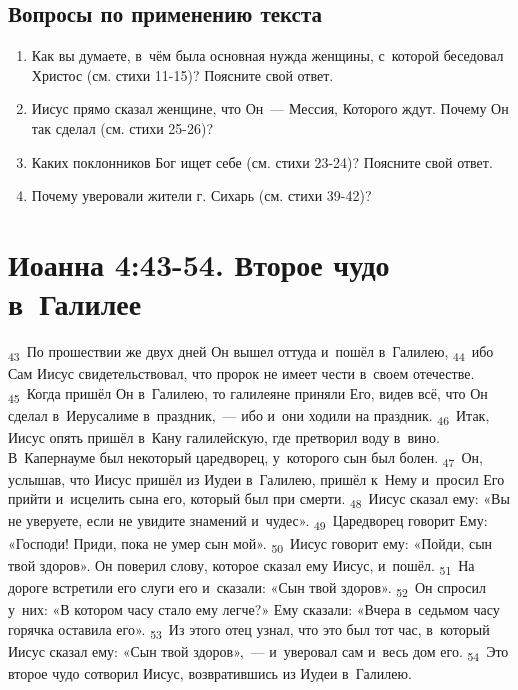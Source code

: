 \documentclass[a4paper,12pt]{article}
\begin{document}
\subsection*{Вопросы по применению текста} 
\begin{enumerate}
    \item Как вы думаете, в~чём была основная нужда женщины, с~которой беседовал Христос (см. стихи 11-15)? Поясните свой ответ. 
    
    \myline
    
    \myline
    \item Иисус прямо сказал женщине, что Он~--- Мессия, Которого ждут. Почему Он так сделал (см. стихи 25-26)? 
    
    \myline
    
    \myline
    \item Каких поклонников Бог ищет себе (см. стихи 23-24)? Поясните свой ответ. 
    
    \myline
    
    \myline
    \item Почему уверовали жители г. Сихарь (см. стихи 39-42)? 
    
    \myline
    
    \myline
\end{enumerate}



\section{Иоанна 4:43-54. Второе чудо в~Галилее}


\textsubscript{43}~По прошествии же двух дней Он вышел оттуда и~пошёл в~Галилею,
\textsubscript{44}~ибо Сам Иисус свидетельствовал, что пророк не имеет чести в~своем отечестве.
\textsubscript{45}~Когда пришёл Он в~Галилею, то галилеяне приняли Его, видев всё, что Он сделал в~Иерусалиме в~праздник,~--- ибо и~они ходили на праздник.
\textsubscript{46}~Итак, Иисус опять пришёл в~Кану галилейскую, где претворил воду в~вино. В~Капернауме был некоторый царедворец, у~которого сын был болен.
\textsubscript{47}~Он, услышав, что Иисус пришёл из Иудеи в~Галилею, пришёл к~Нему и~просил Его прийти и~исцелить сына его, который был при смерти.
\textsubscript{48}~Иисус сказал ему: «Вы не уверуете, если не увидите знамений и~чудес».
\textsubscript{49}~Царедворец говорит Ему: «Господи! Приди, пока не умер сын мой».
\textsubscript{50}~Иисус говорит ему: «Пойди, сын твой здоров». Он поверил слову, которое сказал ему Иисус, и~пошёл.
\textsubscript{51}~На дороге встретили его слуги его и~сказали: «Сын твой здоров».
\textsubscript{52}~Он спросил у~них: «В котором часу стало ему легче?» Ему сказали: «Вчера в~седьмом часу горячка оставила его».
\textsubscript{53}~Из этого отец узнал, что это был тот час, в~который Иисус сказал ему: «Сын твой здоров»,~--- и~уверовал сам и~весь дом его.
\textsubscript{54}~Это второе чудо сотворил Иисус, возвратившись из Иудеи в~Галилею. 
\end{document}
